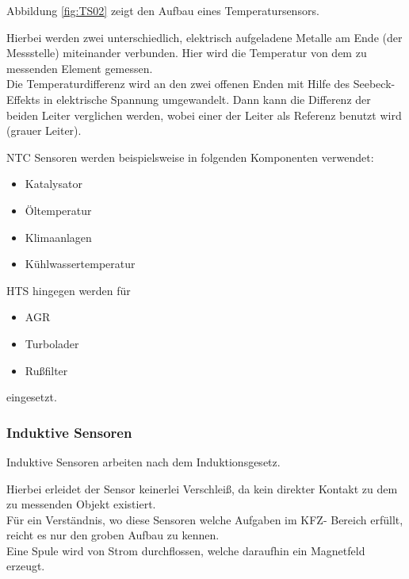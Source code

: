             Abbildung \ref{fig:TS02} zeigt den Aufbau eines Temperatursensors.

            Hierbei werden zwei unterschiedlich, elektrisch aufgeladene Metalle am Ende (der Messstelle) miteinander verbunden. Hier wird die Temperatur von dem zu messenden Element gemessen.\\
            Die Temperaturdifferenz wird an den zwei offenen Enden mit Hilfe des Seebeck-Effekts in elektrische Spannung umgewandelt. 
            Dann kann die Differenz der beiden Leiter verglichen werden, wobei einer der Leiter als Referenz benutzt wird (grauer Leiter).\cite{TS_temp} 
					
			NTC Sensoren werden beispielsweise in folgenden Komponenten verwendet:
			
			\begin{itemize}
				\item Katalysator
				\item Öltemperatur
				\item Klimaanlagen
				\item Kühlwassertemperatur 	
			\end{itemize}
			
            HTS hingegen werden für
            
			\begin{itemize}
				\item AGR
				\item Turbolader
				\item Rußfilter 
            \end{itemize}
            
            eingesetzt.

            \subsubsection{Induktive Sensoren}
		
            Induktive Sensoren arbeiten nach dem Induktionsgesetz.
            
			Hierbei erleidet der Sensor keinerlei Verschleiß, da kein direkter Kontakt zu dem zu messenden Objekt existiert.\\
			Für ein Verständnis, wo diese Sensoren welche Aufgaben im KFZ- Bereich erfüllt, reicht es nur den groben Aufbau zu kennen.\\
			Eine Spule wird von Strom durchflossen, welche daraufhin ein Magnetfeld erzeugt.\\	

